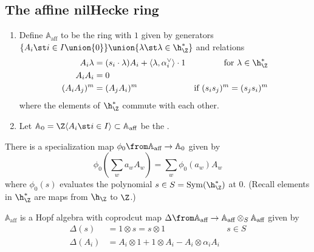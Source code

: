 \documentclass[11pt,leqno,oneside]{amsart}
\numberwithin{thm}{section}
\newcommand{\A}{\mathbb{A}}
\newcommand{\Aaff}{\A_{\text{aff}}}
\begin{document}
\subsection{The affine nilHecke ring}
\begin{defn}
  \begin{enumerate}
  \item Define \(\Aaff\) to be the ring with \(1\) given by generators
    \(\{A_i \st i \in I \union \{0\}\} \union \{\lambda \st \lambda
    \in \h_\Z^*\}\) and relations
    \begin{align*}
      A_i \lambda
      & = (s_i \cdot \lambda) A_i + \langle \lambda,
        \alpha_i^\vee \rangle \cdot 1 & \text{for }\lambda \in \h_\Z^*\\
      A_i A_i & = 0 \\
      (A_i A_j)^m & = (A_jA_i)^m & \text{if }(s_i s_j)^m = (s_j s_i)^m
    \end{align*}
    where the elements of \(\h_\Z^*\) commute with each other.
  \item Let \(\A_0 = \Z\langle A_i \st i \in I \rangle \subset \Aaff\)
    be the .
  \end{enumerate}
\end{defn}
There is a specialization map \(\phi_0 \from \Aaff \to \A_0\) given
by \[
  \phi_0\left( \sum_{w} a_w A_w\right) = \sum_w \phi_0(a_w) A_w
\]
where \(\phi_0(s)\) evaluates the polynomial \(s \in S =
\operatorname{Sym}(\h_\Z^*)\) at \(0\). (Recall elements in
\(\h_\Z^*\) are maps from \(\h_\Z\) to \(\Z\).)
\begin{prop}
  \(\Aaff\) is a Hopf algebra with coprodcut map \(\Delta \from \Aaff
  \to \Aaff \otimes_S \Aaff\) given by
  \begin{align*}
    \Delta(s) & = 1 \otimes s = s \otimes 1 & s \in S\\
    \Delta(A_i) & = A_i \otimes 1 + 1 \otimes A_i - A_i \otimes \alpha_i A_i
  \end{align*}
\end{prop}
\end{document}
